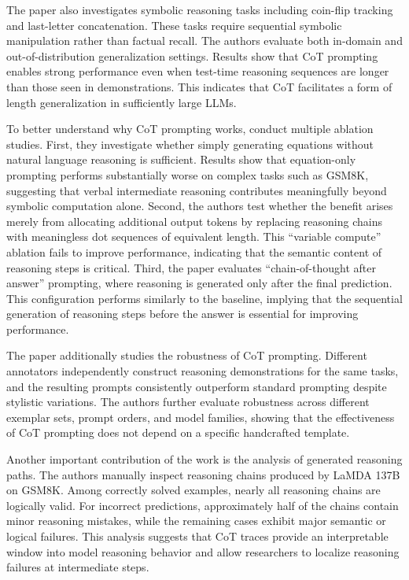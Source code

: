 The paper also investigates symbolic reasoning tasks including coin-flip tracking and last-letter concatenation. These tasks require sequential symbolic manipulation rather than factual recall. The authors evaluate both in-domain and out-of-distribution generalization settings. Results show that CoT prompting enables strong performance even when test-time reasoning sequences are longer than those seen in demonstrations. This indicates that CoT facilitates a form of length generalization in sufficiently large LLMs.

To better understand why CoT prompting works, conduct multiple ablation studies. First, they investigate whether simply generating equations without natural language reasoning is sufficient. Results show that equation-only prompting performs substantially worse on complex tasks such as GSM8K, suggesting that verbal intermediate reasoning contributes meaningfully beyond symbolic computation alone. Second, the authors test whether the benefit arises merely from allocating additional output tokens by replacing reasoning chains with meaningless dot sequences of equivalent length. This ``variable compute'' ablation fails to improve performance, indicating that the semantic content of reasoning steps is critical. Third, the paper evaluates ``chain-of-thought after answer'' prompting, where reasoning is generated only after the final prediction. This configuration performs similarly to the baseline, implying that the sequential generation of reasoning steps before the answer is essential for improving performance.

The paper additionally studies the robustness of CoT prompting. Different annotators independently construct reasoning demonstrations for the same tasks, and the resulting prompts consistently outperform standard prompting despite stylistic variations. The authors further evaluate robustness across different exemplar sets, prompt orders, and model families, showing that the effectiveness of CoT prompting does not depend on a specific handcrafted template.

Another important contribution of the work is the analysis of generated reasoning paths. The authors manually inspect reasoning chains produced by LaMDA 137B on GSM8K. Among correctly solved examples, nearly all reasoning chains are logically valid. For incorrect predictions, approximately half of the chains contain minor reasoning mistakes, while the remaining cases exhibit major semantic or logical failures. This analysis suggests that CoT traces provide an interpretable window into model reasoning behavior and allow researchers to localize reasoning failures at intermediate steps.

